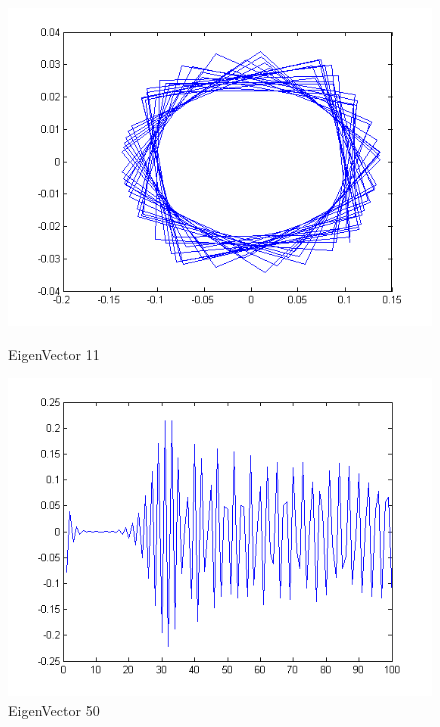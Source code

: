 \documentclass[12pt]{article}
\begin{document}
\begin{figure}[H]
\begin{minipage}[b]{0.5\linewidth}
\includegraphics[scale=.5]{v3p11.png}
\caption{EigenVector 11}
\end{minipage}
\begin{minipage}[b]{0.5\linewidth}
\includegraphics[scale=.5]{v3p50.png}
\caption{EigenVector 50}
\end{minipage}
\end{figure}
\end{document}
